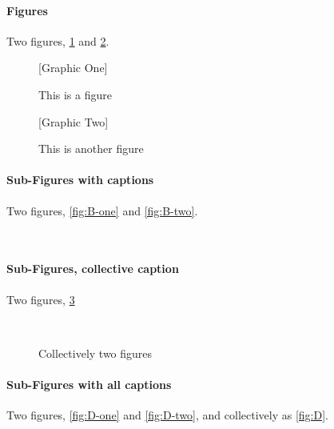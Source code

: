 \documentclass{article}
\begin{document}
\listoftables
\listoffigures
\paragraph{Figures}
Two figures, \ref{fig:A-one} and \ref{fig:A-two}.

\begin{figure}[ht]
\begin{center}
 [Graphic One]\\
\caption{This is a figure\label{fig:A-one}}
\end{center}
\end{figure}

\begin{figure}[ht]
\begin{center}
[Graphic Two]\\
\caption{This is another figure\label{fig:A-two}}
\end{center}
\end{figure}

\paragraph{Sub-Figures with captions}
Two figures, \ref{fig:B-one} and \ref{fig:B-two}.

\begin{figure}[ht]
\begin{center}
\\
\end{center}
\end{figure}

\paragraph{Sub-Figures, collective caption}
Two figures, \ref{fig:C}

\begin{figure}[ht]
\begin{center}
\\
\end{center}
\caption{Collectively two figures\label{fig:C}}
\end{figure}

\paragraph{Sub-Figures with all captions}
Two figures, \ref{fig:D-one} and \ref{fig:D-two},
and collectively as \ref{fig:D}.
\end{document}
